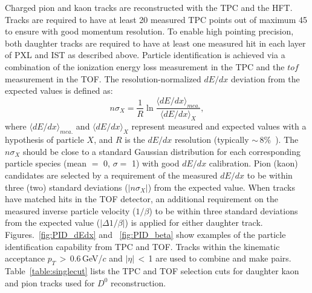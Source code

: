 \documentclass[%
 reprint,	
 amsmath,amssymb,
 aps,
 prc,
]{revtex4-1}
\begin{document}
Charged pion and kaon tracks are reconstructed with the TPC and the HFT. Tracks are required to have at least 20 measured TPC points out of maximum 45 to ensure with good momentum resolution. To enable high pointing precision, both daughter tracks are required to have at least one measured hit in each layer of PXL and IST as described above. Particle identification is achieved via a combination of the ionization energy loss measurement in the TPC and the $tof$ measurement in the TOF. The resolution-normalized $dE/dx$ deviation from the expected values is defined as:
\begin{equation}
n\sigma_X = \frac{1}{R}\ln\frac{\langle{dE/dx}\rangle_{mea.}}{\langle{dE/dx}\rangle_{X}},
\label{equ:equation1}
\end{equation}
where $\langle{dE/dx}\rangle_{mea.}$ and $\langle{dE/dx}\rangle_{X}$ represent measured and expected values with a hypothesis of particle $X$, and $R$ is the $dE/dx$ resolution (typically $\sim$\,8\%~\cite{TPC}). The $n\sigma_X$ should be close to a standard Gaussian distribution for each corresponding particle species (mean $=$ 0, $\sigma = $ 1) with good $dE/dx$ calibration.
Pion (kaon) candidates are selected by a requirement of the measured $dE/dx$ to be within three (two) standard deviations ($|n\sigma_{X}|$) from the expected value. When tracks have matched hits in the TOF detector, an additional requirement on the measured inverse particle velocity ($1/\beta$) to be within three standard deviations from the expected value ($|\Delta 1/\beta|$) is applied for either daughter track. Figures.~\ref{fig:PID_dEdx} and ~\ref{fig:PID_beta} show examples of the particle identification capability from TPC and TOF. Tracks within the kinematic acceptance $p_{T}$\,$>$\,0.6\,GeV/$c$ and $|\eta|$\,$<$\,1 are used to combine and make pairs. Table~\ref{table:singlecut} lists the TPC and TOF selection cuts for daughter kaon and pion tracks used for $D^0$ reconstruction.

\begin{table}
\label{table:singlecut} 
\end{table}
\end{document}
